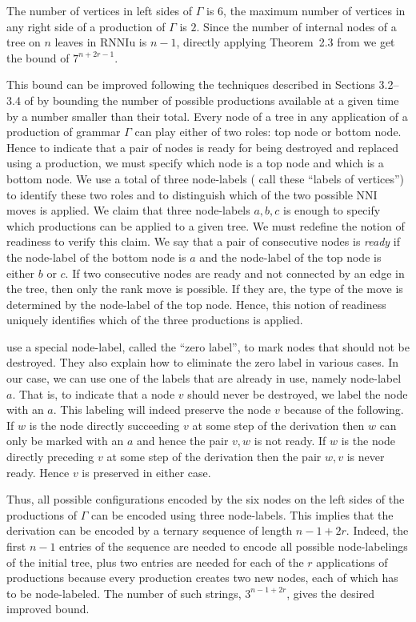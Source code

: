 \documentclass[11pt]{amsart}
\theoremstyle{definition}
\newcommand{\nni}{\mathrm{NNI}}
\newcommand{\rnniu}{\mathrm{RNNIu}}
\begin{document}
The number of vertices in left sides of $\Gamma$ is $6$, the maximum number of vertices in any right side of a production of $\Gamma$ is $2$.
Since the number of internal nodes of a tree on $n$ leaves in $\rnniu$ is $n-1$, directly applying Theorem~2.3 from \autocite{Sleator1992-bp} we get the bound of $7^{n+2r-1}$.

This bound can be improved following the techniques described in Sections 3.2--3.4 of \autocite[][see also Section 5]{Sleator1992-bp} by bounding the number of possible productions available at a given time by a number smaller than their total.
Every node of a tree in any application of a production of grammar $\Gamma$ can play either of two roles: top node or bottom node.
Hence to indicate that a pair of nodes is ready for being destroyed and replaced using a production, we must specify which node is a top node and which is a bottom node.
We use a total of three node-labels (\textcite{Sleator1992-bp} call these ``labels of vertices'') to identify these two roles and to distinguish which of the two possible $\nni$ moves is applied.
We claim that three node-labels $a, b, c$ is enough to specify which productions can be applied to a given tree.
We must redefine the notion of readiness to verify this claim.
We say that a pair of consecutive nodes is \emph{ready} if the node-label of the bottom node is $a$ and the node-label of the top node is either $b$ or $c$.
If two consecutive nodes are ready and not connected by an edge in the tree, then only the rank move is possible.
If they are, the type of the move is determined by the node-label of the top node.
Hence, this notion of readiness uniquely identifies which of the three productions is applied.

\textcite{Sleator1992-bp} use a special node-label, called the ``zero label'', to mark nodes that should not be destroyed.
They also explain how to eliminate the zero label in various cases.
In our case, we can use one of the labels that are already in use, namely node-label $a$.
That is, to indicate that a node $v$ should never be destroyed, we label the node with an $a$.
This labeling will indeed preserve the node $v$ because of the following.
If $w$ is the node directly succeeding $v$ at some step of the derivation then $w$ can only be marked with an $a$ and hence the pair $v, w$ is not ready.
If $w$ is the node directly preceding $v$ at some step of the derivation then the pair $w, v$ is never ready.
Hence $v$ is preserved in either case.

Thus, all possible configurations encoded by the six nodes on the left sides of the productions of $\Gamma$ can be encoded using three node-labels.
This implies that the derivation can be encoded by a ternary sequence of length $n-1+2r$.
Indeed, the first $n-1$ entries of the sequence are needed to encode all possible node-labelings of the initial tree, plus two entries are needed for each of the $r$ applications of productions because every production creates two new nodes, each of which has to be node-labeled.
The number of such strings, $3^{n-1+2r}$, gives the desired improved bound.
\end{document}
